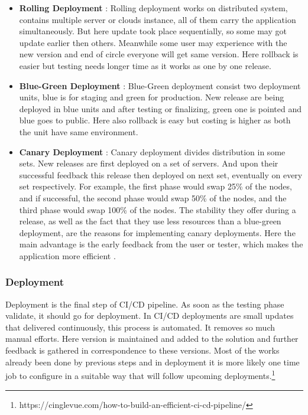    \begin{itemize}
     \item \textbf{Rolling Deployment} : Rolling deployment works on distributed system, contains multiple server or clouds instance, all of them carry the application simultaneously. But here update took place sequentially, so some may got update earlier then others. Meanwhile some user may experience with the new version and end of circle everyone will get same version. Here rollback is easier but testing needs longer time as it works as one by one release.
    
     \item \textbf{Blue-Green Deployment} : Blue-Green deployment consist two deployment units, blue is for staging and green for production. New release are being deployed in blue units and after testing or finalizing, green one is pointed and blue goes to public. Here also rollback is easy but costing is higher as both the unit have same environment.
     
     \item \textbf{Canary Deployment} : Canary deployment divides distribution in some sets. New releases are first deployed on a set of servers. And upon their successful feedback this release then deployed on next set, eventually on every set respectively. For example, the first phase would swap 25\% of the nodes, and if successful, the second phase would swap 50\% of the nodes, and the third phase would swap 100\% of the nodes. The stability they offer during a release, as well as the fact that they use less resources than a blue-green deployment, are the reasons for implementing canary deployments. Here the main advantage is the early feedback from the user or tester, which makes the application more efficient \cite{inproceedingsMunch}.
   \end{itemize}


\subsubsection{Deployment}

Deployment is the final step of CI/CD pipeline. As soon as the testing phase validate, it should go for deployment. In CI/CD deployments are small updates that delivered continuously, this process is automated. It removes so much manual efforts. Here version is maintained and added to the solution and further feedback is gathered in correspondence to these versions. Most of the works already been done by previous steps and in deployment it is more likely one time job to configure in a suitable way that will follow upcoming deployments.\footnote{https://cinglevue.com/how-to-build-an-efficient-ci-cd-pipeline/}


